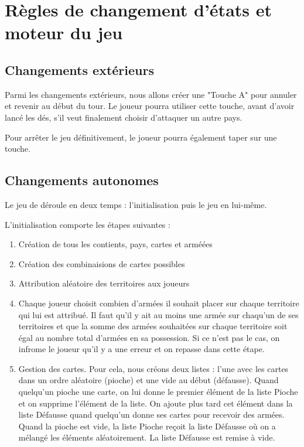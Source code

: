 \section{Règles de changement d'états et moteur du jeu}

\subsection{Changements extérieurs}
Parmi les changements extérieurs, nous allons créer une "Touche A" pour annuler et revenir au début du tour. Le joueur pourra utiliser cette touche, avant d'avoir lancé les dés, s'il veut finalement choisir d'attaquer un autre pays. %

Pour arrêter le jeu définitivement, le joueur pourra également taper sur une touche.

\subsection{Changements autonomes}

Le jeu de déroule en deux temps : l'initialisation puis le jeu en lui-même. 

\vspace{0.3cm}
L'initialisation comporte les étapes suivantes : 
\begin{enumerate}
    \item Création de tous les contients, pays, cartes et arméées
    \item Création des combinaisions de cartes possibles
    \item Attribution aléatoire des territoires aux joueurs 
    \item Chaque joueur choisit combien d'armées il souhait placer sur chaque territoire qui lui est attribué. Il faut qu'il y ait au moins une armée sur chaqu'un de ses territoires et que la somme des armées souhaitées sur chaque territoire soit égal au nombre total d'armées en sa possession. Si ce n'est pas le cas, on infrome le joueur qu'il y a une erreur et on repasse dans cette étape.
    \item Gestion des cartes. Pour cela, nous créons deux listes :  l’une avec les cartes dans un ordre aléatoire (pioche) et une vide au début (défausse). Quand quelqu’un pioche une carte, on lui donne le premier élément de la liste Pioche et on supprime l’élément de la liste. On ajoute plus tard cet élément dans la liste Défausse quand quelqu’un donne ses cartes pour recevoir des armées. Quand la pioche est vide, la liste Pioche reçoit la liste Défausse où on a mélangé les éléments aléatoirement. La liste Défausse est remise à vide.
\end{enumerate}

